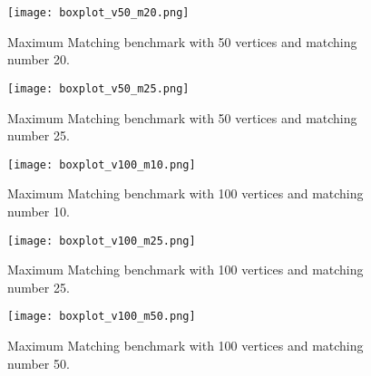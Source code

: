 \begin{figure}[H]
  \centering
  \texttt{[image: boxplot\_v50\_m20.png]}
  \caption{Maximum Matching benchmark with 50 vertices and matching number 20.}
  \label{fig:v50m20}
\end{figure}
\begin{figure}[H]
  \centering
  \texttt{[image: boxplot\_v50\_m25.png]}
  \caption{Maximum Matching benchmark with 50 vertices and matching number 25.}
  \label{fig:v50m25}
\end{figure}
\begin{figure}[H]
  \centering
  \texttt{[image: boxplot\_v100\_m10.png]}
  \caption{Maximum Matching benchmark with 100 vertices and matching number 10.}
  \label{fig:v100m10}
\end{figure}
\begin{figure}[H]
  \centering
  \texttt{[image: boxplot\_v100\_m25.png]}
  \caption{Maximum Matching benchmark with 100 vertices and matching number 25.}
  \label{fig:v100m20}
\end{figure}
\begin{figure}[H]
  \centering
  \texttt{[image: boxplot\_v100\_m50.png]}
  \caption{Maximum Matching benchmark with 100 vertices and matching number 50.}
  \label{fig:v100m50}
\end{figure}
